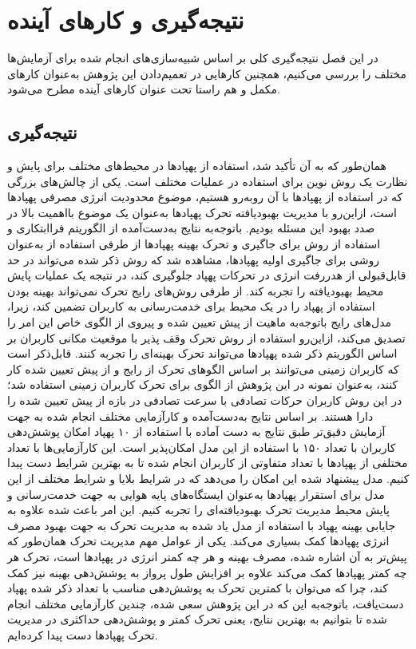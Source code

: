 \chapter{نتیجه‌گیری و کا‌ر‌های آینده}\label{Chapter5}
در این فصل نتیجه‌گیری کلی بر اساس شبیه‌سازی‌های انجام شده برای آزمایش‌ها مختلف را بررسی می‌کنیم، همچنین کارهایی در تعمیم‌دادن این پژوهش به‌عنوان کارهای مکمل و هم راستا تحت عنوان کارهای آینده مطرح می‌شود. 
\section{نتیجه‌گیری}
همان‌طور که به آن تأکید شد، استفاده از پهپادها در محیط‌های مختلف برای پایش و نظارت یک روش نوین برای استفاده در عملیات مختلف است. یکی از چالش‌های بزرگی که در استفاده از پهپادها با آن روبه‌رو هستیم، موضوع محدودیت انرژی مصرفی پهپادها است، ازاین‌رو با مدیریت بهبودیافته تحرک پهپادها به‌عنوان یک موضوع بااهمیت بالا در صدد بهبود این مسئله بودیم.
باتوجه‌به نتایج به‌دست‌آمده از الگوریتم فراابتکاری  و استفاده از روش  برای جاگیری و تحرک بهینه پهپادها از طرفی استفاده از  به‌عنوان روشی برای جاگیری اولیه پهپادها، مشاهده شد که روش ذکر شده می‌تواند در حد قابل‌قبولی از هدررفت انرژی در تحرکات پهپاد جلوگیری کند، در نتیجه یک عملیات پایش محیط بهبودیافته را تجربه کند. از طرفی روش‌های رایج تحرک نمی‌تواند بهینه بودن استفاده از پهپاد را در یک محیط برای خدمت‌رسانی به کاربران تضمین کند، زیرا، مدل‌های رایج باتوجه‌به ماهیت از پیش تعیین شده و پیروی از الگوی خاص این امر را تصدیق می‌کند، ازاین‌رو استفاده از روش تحرک وقف پذیر با موقعیت مکانی کاربران بر اساس الگوریتم ذکر شده پهپادها می‌تواند تحرک بهینه‌ای را تجربه کنند. قابل‌ذکر است که کاربران زمینی می‌توانند بر اساس الگوهای تحرک از رایج و از پیش تعیین شده کار کنند، به‌عنوان نمونه در این پژوهش از الگوی  برای تحرک کاربران زمینی استفاده شد؛ در این روش کاربران حرکات تصادفی با سرعت تصادفی در بازه از پیش تعیین شده را دارا هستند. بر اساس نتایج به‌دست‌آمده و کارآزمایی مختلف انجام شده به جهت آزمایش دقیق‌تر طبق نتایج به دست آماده با استفاده از ۱۰ پهپاد امکان پوشش‌دهی کاربران با تعداد ۱۵۰ با استفاده از این مدل امکان‌پذیر است. این کارآزمایی‌ها با تعداد مختلفی از پهپادها با تعداد متفاوتی از کاربران انجام شده تا به بهترین شرایط دست پیدا کنیم. مدل پیشنهاد شده این امکان را می‌دهد که در شرایط بلایا و شرایط مختلف از این مدل برای استقرار پهپادها به‌عنوان ایستگاه‌های پایه هوایی به جهت خدمت‌رسانی و پایش محیط مدیریت تحرک بهبودیافته‌ای را تجربه کنیم. این امر باعث شده علاوه به جایابی بهینه پهپاد با استفاده از مدل یاد شده به مدیریت تحرک به جهت بهبود مصرف انرژی پهپادها کمک بسیاری می‌کند.
یکی از عوامل مهم مدیریت تحرک همان‌طور که پیش‌تر به آن اشاره شده، مصرف بهینه و هر چه کمتر انرژی در پهپادها است، تحرک هر چه کمتر پهپادها کمک می‌کند علاوه بر افزایش طول پرواز به پوشش‌دهی بهینه نیز کمک کند، چرا که می‌توان با کمترین تحرک به پوشش‌دهی مناسب با تعداد ذکر شده پهپاد دست‌یافت، باتوجه‌به این که در این پژوهش سعی شده، چندین کارآزمایی مختلف انجام شده تا بتوانیم به بهترین نتایج، یعنی تحرک کمتر و پوشش‌دهی حداکثری در مدیریت تحرک پهپادها دست پیدا کرده‌ایم.

